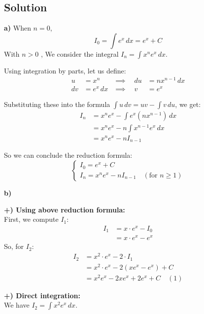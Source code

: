 \subsection*{Solution}
\textbf{a)} 
\noindent  When $n=0$,
\[
    I_0 = \int e^x \, dx = e^x + C
\]
\noindent With $n > 0$ ,
\quad We consider the integral $I_n = \int x^n e^x \, dx$.

\noindent Using integration by parts, let us define:
\begin{align*}
    u &= x^n & \implies \quad du &= n x^{n-1} \, dx \\
    dv &= e^x \, dx & \implies \quad v &= e^x
\end{align*}

\noindent Substituting these into the formula $\int u \, dv = uv - \int v \, du$, we get:
\begin{align*}
    I_n &= x^n e^x - \int e^x \left( n x^{n-1} \right) \, dx \\
        &= x^n e^x - n \int x^{n-1} e^x \, dx \\
        &= x^n e^x - n I_{n-1}
\end{align*}

\noindent So we can conclude the reduction formula:
\[
\begin{cases}
    I_0 = e^x + C \\
    I_n = x^n e^x - n I_{n-1} \quad (\text{for } n \ge 1)
\end{cases}
\]

\vspace{1em}

\textbf{b)}

\noindent \textbf{+) Using above reduction formula:} \\
First, we compute $I_1$:
\begin{align*}
    I_1 &= x \cdot e^x - I_0 \\
        &= x \cdot e^x - e^x
\end{align*}
So, for $I_2$:
\begin{align*}
    I_2 &= x^2 \cdot e^x - 2 \cdot I_1 \\
        &= x^2 \cdot e^x - 2(x e^x - e^x) + C \\
        &= x^2 e^x - 2x e^x + 2e^x + C \quad (1)
\end{align*}

\vspace{1em}

\noindent \textbf{+) Direct integration:} \\
We have $I_2 = \int x^2 e^x \, dx$.

